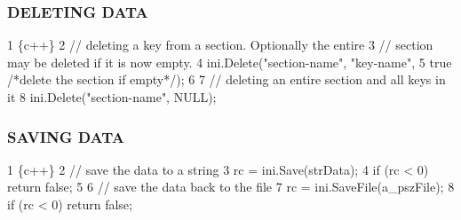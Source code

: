 \subsubsection*{D\+E\+L\+E\+T\+I\+NG D\+A\+TA}


\begin{DoxyCode}
1 \{c++\}
2 // deleting a key from a section. Optionally the entire
3 // section may be deleted if it is now empty.
4 ini.Delete("section-name", "key-name", 
5     true /*delete the section if empty*/);
6 
7 // deleting an entire section and all keys in it
8 ini.Delete("section-name", NULL);
\end{DoxyCode}


\subsubsection*{S\+A\+V\+I\+NG D\+A\+TA}


\begin{DoxyCode}
1 \{c++\}
2 // save the data to a string
3 rc = ini.Save(strData);
4 if (rc < 0) return false;
5 
6 // save the data back to the file
7 rc = ini.SaveFile(a\_pszFile);
8 if (rc < 0) return false;
\end{DoxyCode}
 